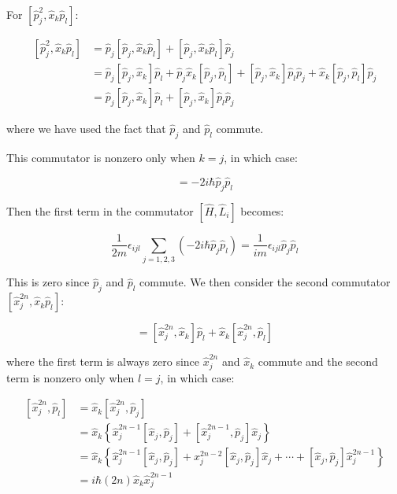 \documentclass[12pt]{article}
\begin{document}
For $[\hat{p}_{j}^{2}, \hat{x}_{k} \hat{p}_{l}]$:

\begin{equation}
\begin{split}
    [\hat{p}_{j}^{2}, \hat{x}_{k} \hat{p}_{l}] &= \hat{p}_{j} [\hat{p}_{j}, \hat{x}_{k} \hat{p}_{l}] + [\hat{p}_{j}, \hat{x}_{k} \hat{p}_{l}] \hat{p}_{j} \\
    &= \hat{p}_{j} [\hat{p}_{j}, \hat{x}_{k}] \hat{p}_{l} + \hat{p}_{j} \hat{x}_{k} [\hat{p}_{j}, \hat{p}_{l}] + [\hat{p}_{j}, \hat{x}_{k}] \hat{p}_{l} \hat{p}_{j} + \hat{x}_{k} [\hat{p}_{j}, \hat{p}_{l}] \hat{p}_{j} \\
    &= \hat{p}_{j} [\hat{p}_{j}, \hat{x}_{k}] \hat{p}_{l} + [\hat{p}_{j}, \hat{x}_{k}] \hat{p}_{l} \hat{p}_{j}
\end{split}
\end{equation}

where we have used the fact that $\hat{p}_{j}$ and $\hat{p}_{l}$ commute.

This commutator is nonzero only when $k = j$, in which case:

\begin{equation}
    [\hat{p}_{j}^{2}, \hat{x}_{k} \hat{p}_{l}] = -2i\hbar \hat{p}_{j} \hat{p}_{l}
\end{equation}

Then the first term in the commutator $[\hat{H}, \hat{L}_{i}]$ becomes:

\begin{equation}
    \frac{1}{2m} \epsilon_{ijl} \sum_{j = 1, 2, 3} (-2i\hbar \hat{p}_{j} \hat{p}_{l}) = \frac{1}{im} \epsilon_{ijl} \hat{p}_{j} \hat{p}_{l}
\end{equation}

This is zero since $\hat{p}_{j}$ and $\hat{p}_{l}$ commute. We then consider the second commutator $[\hat{x}_{j}^{2n}, \hat{x}_{k} \hat{p}_{l}]$:

\begin{equation}
    [\hat{x}_{j}^{2n}, \hat{x}_{k} \hat{p}_{l}] = [\hat{x}_{j}^{2n}, \hat{x}_{k}] \hat{p}_{l} + \hat{x}_{k} [\hat{x}_{j}^{2n}, \hat{p}_{l}]
\end{equation}

where the first term is always zero since $\hat{x}_{j}^{2n}$ and $\hat{x}_{k}$ commute and the second term is nonzero only when $l = j$, in which case:

\begin{equation}
\begin{split}
    [\hat{x}_{j}^{2n}, \hat{p}_{l}] &= \hat{x}_{k} [\hat{x}_{j}^{2n}, \hat{p}_{j}] \\
    &= \hat{x}_{k} \left\{ \hat{x}_{j}^{2n-1} [\hat{x}_{j}, \hat{p}_{j}] + [\hat{x}_{j}^{2n-1}, \hat{p}_{j}] \hat{x}_{j} \right\} \\
    &= \hat{x}_{k} \left\{ \hat{x}_{j}^{2n-1} [\hat{x}_{j}, \hat{p}_{j}] + x_{j}^{2n-2} [\hat{x}_{j}, \hat{p}_{j}] \hat{x}_{j} + \cdots + [\hat{x}_{j}, \hat{p}_{j}] \hat{x}_{j}^{2n-1} \right\} \\
    &= i \hbar (2n) \hat{x}_{k} \hat{x}_{j}^{2n-1}
\end{split}
\end{equation}
\end{document}
